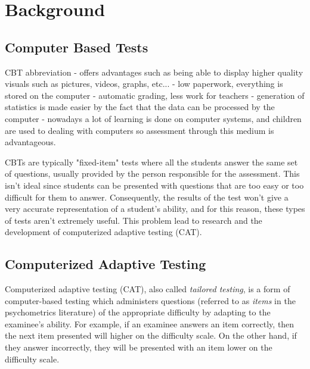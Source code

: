 \chapter{Background}

\section{Computer Based Tests}
CBT abbreviation
- offers advantages such as being able to display higher quality visuals such as pictures, videos, graphs, etc...
- low paperwork, everything is stored on the computer
- automatic grading, less work for teachers
- generation of statistics is made easier by the fact that the data can be processed by the computer
- nowadays a lot of learning is done on computer systems, and children are used to dealing with computers so assessment through this medium is advantageous. \newline

CBTs are typically "fixed-item" tests where all the students answer the same set of questions,  usually provided by the person responsible for the assessment. This isn't ideal since students can be presented with questions that are too easy or too difficult for them to answer. Consequently, the results of the test won't give a very accurate representation of a student's ability, and for this reason, these types of tests aren't extremely useful. This problem lead to research and the development of computerized adaptive testing (CAT).

\section{Computerized Adaptive Testing}
\label{sec:CAT}
Computerized adaptive testing (CAT), also called \textit{tailored testing}, is a form of computer-based testing which administers questions (referred to as \textit{items} in the psychometrics literature) of the appropriate difficulty by adapting to the examinee's ability.
For example, if an examinee answers an item correctly, then the next item presented will higher on the difficulty scale. On the other hand, if they answer incorrectly, they will be presented with an item lower on the difficulty scale. \newline

